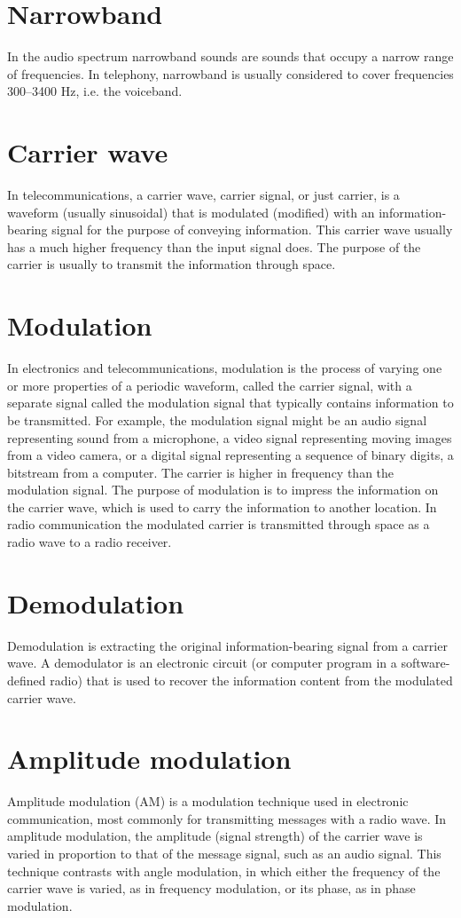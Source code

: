 \documentclass[journal,compsoc]{IEEEtran}
\begin{document}
\section{Narrowband}
In the audio spectrum narrowband sounds are sounds that occupy a narrow range of frequencies. In telephony, narrowband is usually considered to cover frequencies 300–3400 Hz, i.e. the voiceband.

\section{Carrier wave}
In telecommunications, a carrier wave, carrier signal, or just carrier, is a waveform (usually sinusoidal) that is modulated (modified) with an information-bearing signal for the purpose of conveying information. This carrier wave usually has a much higher frequency than the input signal does. The purpose of the carrier is usually to transmit the information through space.

\section{Modulation}
In electronics and telecommunications, modulation is the process of varying one or more properties of a periodic waveform, called the carrier signal, with a separate signal called the modulation signal that typically contains information to be transmitted. For example, the modulation signal might be an audio signal representing sound from a microphone, a video signal representing moving images from a video camera, or a digital signal representing a sequence of binary digits, a bitstream from a computer. The carrier is higher in frequency than the modulation signal. The purpose of modulation is to impress the information on the carrier wave, which is used to carry the information to another location. In radio communication the modulated carrier is transmitted through space as a radio wave to a radio receiver.

\section{Demodulation}
Demodulation is extracting the original information-bearing signal from a carrier wave. A demodulator is an electronic circuit (or computer program in a software-defined radio) that is used to recover the information content from the modulated carrier wave.

\section{Amplitude modulation}
Amplitude modulation (AM) is a modulation technique used in electronic communication, most commonly for transmitting messages with a radio wave. In amplitude modulation, the amplitude (signal strength) of the carrier wave is varied in proportion to that of the message signal, such as an audio signal. This technique contrasts with angle modulation, in which either the frequency of the carrier wave is varied, as in frequency modulation, or its phase, as in phase modulation.



\vspace{12pt}
\end{document}
